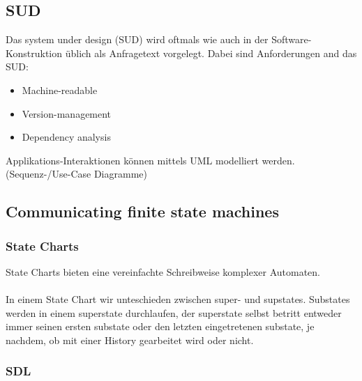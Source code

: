 \subsection{SUD}

Das system under design (SUD) wird oftmals wie auch in der Software-Konstruktion üblich als Anfragetext
vorgelegt.
Dabei sind Anforderungen and das SUD:
\begin{itemize}
    \item Machine-readable
    \item Version-management
    \item Dependency analysis
\end{itemize}
Applikations-Interaktionen können mittels UML modelliert werden. (Sequenz-/Use-Case Diagramme)



\subsection{Communicating finite state machines}

\subsubsection{State Charts}
State Charts bieten eine vereinfachte Schreibweise komplexer Automaten.
\\ \\
In einem State Chart wir unteschieden zwischen super- und supstates.
Substates werden in einem superstate durchlaufen, der superstate selbst betritt entweder immer seinen
ersten substate oder den letzten eingetretenen substate, je nachdem, ob mit einer History gearbeitet wird
oder nicht.



\subsubsection{SDL}

